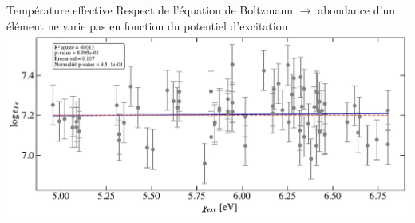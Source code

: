\documentclass[10pt]{beamer}
\begin{document}
\begin{frame}[fragile]{Température effective}
    Respect de l'équation de Boltzmann $\rightarrow$  abondance d'un élément ne varie pas en fonction du potentiel d'excitation \\ 
    \vspace{1cm}
    \includegraphics[width=\textwidth]{images/comparaison_modèles.pdf}
\end{frame}
\end{document}

